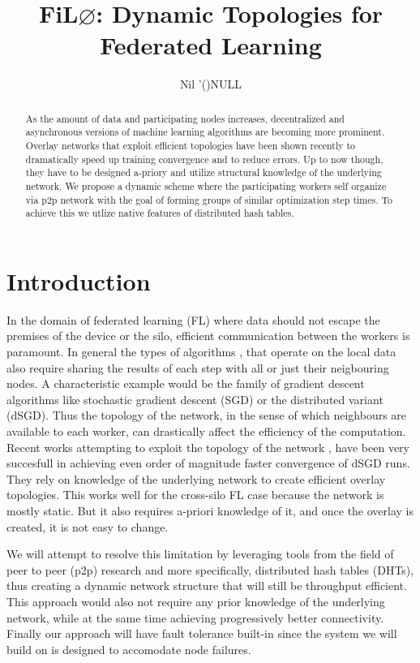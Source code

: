 \documentclass[12pt,notitlepage]{article}
\title{FiL$\varnothing$: Dynamic Topologies for Federated Learning}
\author{Nil '()NULL}
\begin{document}
\maketitle
\begin{abstract}
As the amount of data and participating nodes increases, decentralized and 
asynchronous versions of machine learning algorithms are becoming more 
prominent. Overlay networks that exploit efficient topologies have been 
shown recently to dramatically speed up training convergence and to reduce 
errors.  Up to now though, they have to be designed a-priory and utilize 
structural knowledge of the underlying network. We propose a dynamic scheme 
where the participating workers self organize via p2p network with the goal
of forming groups of similar optimization step times. To achieve this we utlize
native features of distributed hash tables.
\end{abstract}
\section{Introduction}
In the domain of federated learning (FL) where data should not escape the
premises of the device or the silo, efficient communication between the workers
is paramount. In general the types of algorithms 
\cite{towardsFL}, 
\cite{DecentralizedFederatedMultitaskLearning} that operate on the local data 
also require sharing the results of each step with all or just their 
neigbouring nodes. A characteristic example would be the family of gradient 
descent algorithms like stochastic gradient descent (SGD) or the distributed
variant (dSGD). Thus the topology of the network, in the sense of which
neighbours are available to each worker, can drastically affect the
efficiency of the computation. Recent works attempting to exploit the topology
of the network \cite{marfoq2020throughputoptimal}, \cite{matcha} 
have been very succesfull in achieving even order of magnitude faster 
convergence of dSGD runs. They rely on knowledge of the underlying network to
create efficient overlay topologies. This works well for the cross-silo 
FL case because the network is mostly static. But it also 
requires a-priori knowledge of it, and once the overlay is created, it is not
easy to change.

We will attempt to resolve this limitation by leveraging tools from the field
of peer to peer (p2p) research  and more specifically, distributed hash tables 
(DHTs), thus creating a dynamic network structure that will still be throughput
efficient. This approach would also not require any prior knowledge of the 
underlying network, while at the same time achieving progressively better 
connectivity. Finally our approach will have fault tolerance built-in since
the system we will build on is designed to accomodate node failures.
\end{document}
